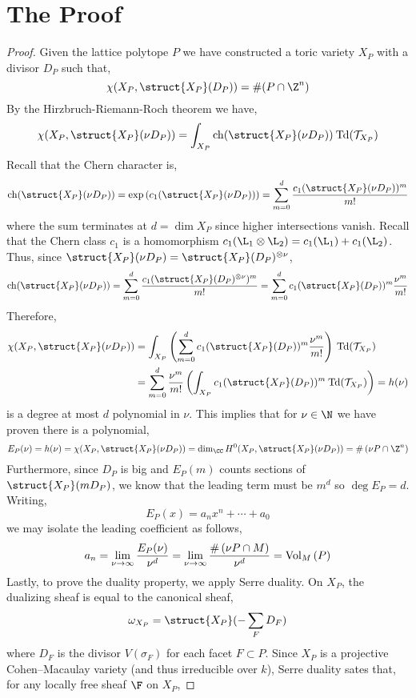 \documentclass[12pt]{article}
\begin{document}
\section{The Proof}

\begin{proof}
Given the lattice polytope $P$ we have constructed a toric variety $X_P$ with a divisor $D_P$ such that,
\[ \chi(X_P, \struct{X_P}(D_P)) = \# (P \cap \Z^n) \]
By the Hirzbruch-Riemann-Roch theorem we have,
\[ \chi(X_P, \struct{X_P}(\nu D_P)) = \int_{X_P} \mathrm{ch}(\struct{X_P}(\nu D_P)) \: \mathrm{Td}(\mathcal{T}_{X_P}) \]
Recall that the Chern character is,
\[ \mathrm{ch}(\struct{X_P}(\nu D_P)) = \exp{(c_1(\struct{X_P}(\nu D_P)))} = \sum_{m = 0}^d \frac{c_1(\struct{X_P}(\nu D_P))^m}{m!} \] 
where the sum terminates at $d = \dim{X_P}$ since higher intersections vanish. Recall that the Chern class $c_1$ is a homomorphism $c_1(\L_1 \otimes \L_2) = c_1(\L_1) + c_1(\L_2)$. Thus, since $\struct{X_P}(\nu D_P) = \struct{X_P}(D_P)^{\otimes \nu}$,
\[ \mathrm{ch}(\struct{X_P}(\nu D_P)) = \sum_{m = 0}^d \frac{c_1(\struct{X_P}(D_P)^{\otimes \nu})^m}{m!} =  \sum_{m = 0}^d c_1(\struct{X_P}(D_P))^m \frac{\nu^m}{m!} \] 
Therefore,
\begin{align*}
\chi(X_P, \struct{X_P}(\nu D_P)) & = \int_{X_P} \left( \sum_{m = 0}^d c_1(\struct{X_P}(D_P))^m \frac{\nu^m}{m!} \right) \: \mathrm{Td}(\mathcal{T}_{X_P}) 
\\
& = \sum_{m = 0}^d \frac{\nu^m}{m!} \left( \int_{X_P} c_1(\struct{X_P}(D_P))^m \: \mathrm{Td}(\mathcal{T}_{X_P}) \right) = h(\nu) 
\end{align*}
is a degree at most $d$ polynomial in $\nu$. This implies that for $\nu \in \N$ we have proven there is a polynomial,
\[ E_P(\nu) = h(\nu) = \chi(X_P, \struct{X_P}(\nu D_P)) = \dim_{\CC} H^0(X_P, \struct{X_P}(\nu D_P)) = \# \left( \nu P \cap \Z^n \right) \]
Furthermore, since $D_P$ is big and $E_P(m)$ counts sections of $\struct{X_P}(m D_P)$, we know that the leading term must be $m^d$ so $\deg{E_P} = d$. Writing,
\[ E_P(x) = a_n x^n + \cdots + a_0 \]
we may isolate the leading coefficient as follows,
\[ a_n = \lim_{\nu \to \infty} \frac{E_P(\nu)}{\nu^d} = \lim_{\nu \to \infty} \frac{\# \left( \nu P \cap M \right)}{\nu^d} = \mathrm{Vol}_{M}\left( P \right) \] 
Lastly, to prove the duality property, we apply Serre duality. On $X_P$, the dualizing sheaf is equal to the canonical sheaf,
\[ \omega_{X_P} = \struct{X_P}( - \sum_F D_F) \]
where $D_F$ is the divisor $V(\sigma_F)$ for each facet $F \subset P$. Since $X_P$ is a projective Cohen–Macaulay variety (and thus irreducible over $k$), Serre duality sates that, for any locally free sheaf $\F$ on $X_P$,

\end{proof}
\end{document}
